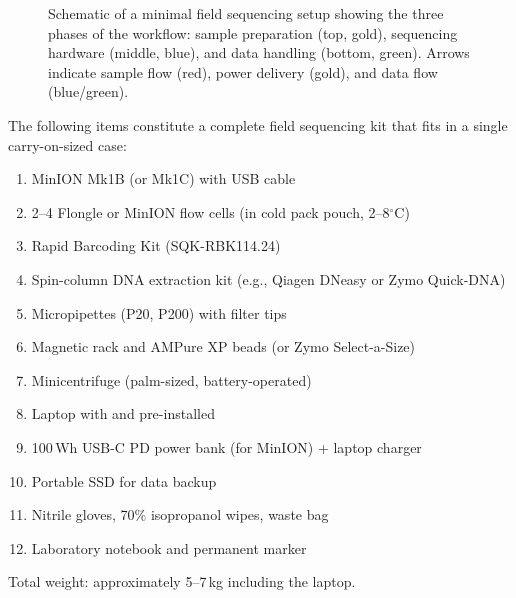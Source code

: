 \begin{figure}[htbp]
\caption[Field sequencing setup]{Schematic of a minimal field sequencing setup showing the three phases of the workflow: sample preparation (top, gold), sequencing hardware (middle, blue), and data handling (bottom, green). Arrows indicate sample flow (red), power delivery (gold), and data flow (blue/green).}
\label{fig:accessible:fieldsetup}
\end{figure}

\begin{protocolbox}[title={Field Sequencing Packing Checklist}]
The following items constitute a complete field sequencing kit that fits in a single carry-on-sized case:
\begin{enumerate}[itemsep=1pt]
  \item MinION Mk1B (or Mk1C) with USB cable
  \item 2--4 Flongle or MinION flow cells (in cold pack pouch, 2--8$^{\circ}$C)
  \item Rapid Barcoding Kit (SQK-RBK114.24)
  \item Spin-column DNA extraction kit (e.g., Qiagen DNeasy or Zymo Quick-DNA)
  \item Micropipettes (P20, P200) with filter tips
  \item Magnetic rack and AMPure XP beads (or Zymo Select-a-Size)
  \item Minicentrifuge (palm-sized, battery-operated)
  \item Laptop with  and  pre-installed
  \item 100\,Wh USB-C PD power bank (for MinION) + laptop charger
  \item Portable SSD for data backup
  \item Nitrile gloves, 70\% isopropanol wipes, waste bag
  \item Laboratory notebook and permanent marker
\end{enumerate}
Total weight: approximately 5--7\,kg including the laptop.
\end{protocolbox}

